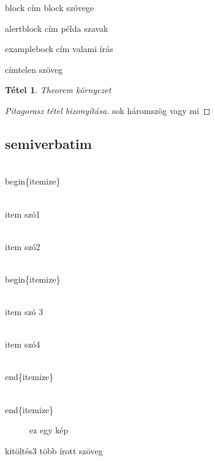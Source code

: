 \documentclass[aspectratio=169,bigger,xcolor={table}]{beamer}
\newtheorem{tet}{Tétel}
\begin{document}
\begin{frame}
\begin{block}{block cím}
block szövege
\end{block} \pause
\begin{alertblock}{alertblock cím}
példa szavak
\end{alertblock} \pause \pause
\begin{exampleblock}{examplebock cím}
valami írás
\end{exampleblock}
\begin{block}{}
címtelen szöveg
\end{block}
\end{frame}

\begin{frame}
\begin{tet}
Theorem környezet
\end{tet} \pause
\begin{proof}[Pitagorasz tétel bizonyítása]
sok háromszög vagy mi
\end{proof}
\end{frame}

\subsection{semiverbatim}

\begin{frame}
\begin{semiverbatim}

\\begin\{itemize\}

\\item szó1

\\item szó2

\\begin\{itemize\}

\\item szó 3

\\item szó4

\\end\{itemize\}

\\end\{itemize\}

\end{semiverbatim}
\end{frame}

\begin{frame}
\begin{figure}
\caption{ez egy kép}
\end{figure}
kitöltés3
több írott szöveg
\end{frame}
\end{document}
